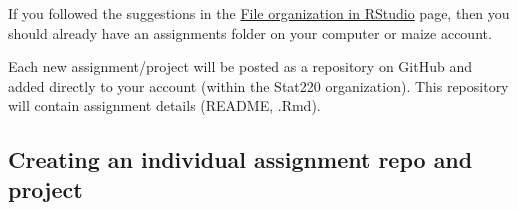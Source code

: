 \documentclass[
]{book}
\begin{document}
If you followed the suggestions in the \protect\hyperlink{software}{File organization in RStudio} page, then you should already have an
assignments folder on your computer or maize account.

Each new assignment/project will be posted as a repository on GitHub and
added directly to your account (within the Stat220 organization). This
repository will contain assignment details (README, .Rmd).

\hypertarget{creating-an-individual-assignment-repo-and-project}{%
\subsection{Creating an individual assignment repo and project}\label{creating-an-individual-assignment-repo-and-project}}
\end{document}
